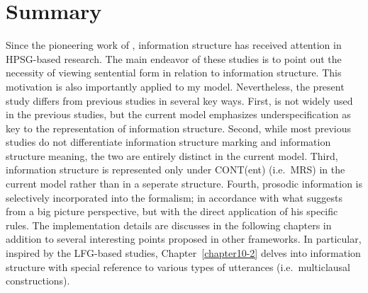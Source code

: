\section{Summary}
\label{8:ssec:summary}

Since the pioneering work of \citet{engdahl:vallduvi:96}, information
structure has received attention in HPSG-based research.  The main
endeavor of these studies is to point out the necessity of viewing
sentential form in relation to information structure. This motivation
is also importantly applied to my model. Nevertheless, the present
study differs from previous studies in several key ways. First,
 is not widely used in the previous studies,
but the current model emphasizes underspecification as key to the
representation of information structure. Second, while most previous
studies do not differentiate information structure marking and
information structure meaning, the two are entirely distinct in the
current model. Third, information structure is represented only under
CONT(ent) (i.e.\ MRS) in the current model rather than in a
seperate structure. Fourth, prosodic information is selectively
incorporated into the formalism; in accordance with what
\citet{bildhauer:07} suggests from a big picture perspective, but with
the direct application of his specific rules.  The implementation
details are discusses in the following chapters in addition to several
interesting points proposed in other frameworks. In particular,
inspired by the LFG-based studies, Chapter~\ref{chapter10-2} delves
into information structure with special reference to various types of
utterances (i.e.\ multiclausal constructions).

